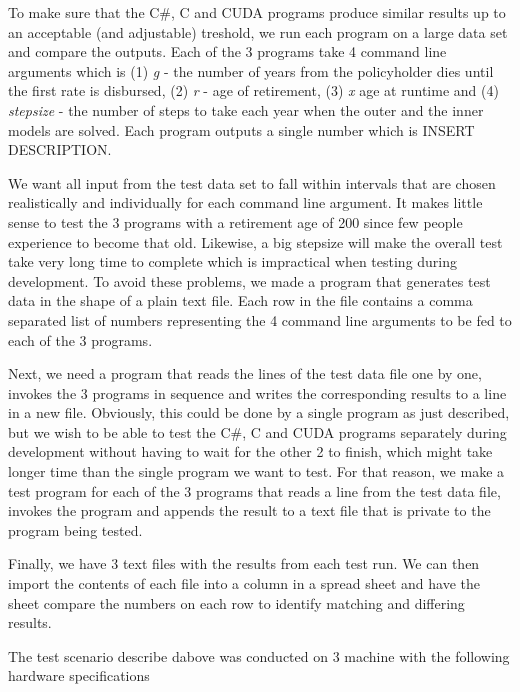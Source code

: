To make sure that the C\#, C and CUDA programs produce similar results up to an acceptable (and adjustable) treshold, we run each program on a large data set and compare the outputs. Each of the 3 programs take 4 command line arguments which is (1) \emph{g} - the number of years from the policyholder dies until the first rate is disbursed, (2) \emph{r} -  age of retirement, (3) \emph{x} age at runtime and (4) \emph{stepsize} - the number of steps to take each year when the outer and the inner models are solved. Each program outputs a single number which is INSERT DESCRIPTION. 

We want all input from the test data set to fall within intervals that are chosen realistically and individually for each command line argument. It makes little sense to test the 3 programs with a retirement age of 200 since few people experience to become that old. Likewise, a big stepsize will make the overall test take very long time to complete which is impractical when testing during development. To avoid these problems, we made a program that generates test data in the shape of a plain text file. Each row in the file contains a comma separated list of numbers representing the 4 command line arguments to be fed to each of the 3 programs.

Next, we need a program that reads the lines of the test data file one by one, invokes the 3 programs in sequence and writes the corresponding results to a line in a new file. Obviously, this could be done by a single program as just described, but we wish to be able to test the C\#, C and CUDA programs separately during development without having to wait for the other 2 to finish, which might take longer time than the single program we want to test. For that reason, we make a test program for each of the 3 programs that reads a line from the test data file, invokes the program and appends the result to a text file that is private to the program being tested. 

Finally, we have 3 text files with the results from each test run. We can then import the contents of each file into a column in a spread sheet and have the sheet compare the numbers on each row to identify matching and differing results.

The test scenario describe dabove was conducted on 3 machine with the following hardware specifications


